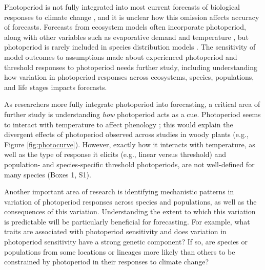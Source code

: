 \documentclass{article}
\begin{document}
\par Photoperiod is not fully integrated into most current forecasts of biological responses to climate change \citep[but see][]{tobin2008}, and it is unclear how this omission affects accuracy of forecasts. Forecasts from ecosystem models often incorporate photoperiod, along with other variables such as evaporative demand and temperature \citep [e.g., ED] []{jolly2005,medvigy2013}, but photoperiod is rarely included in species distribution models \citep [e.g.,] []{morin2009,zhu2012}. The sensitivity of model outcomes to assumptions made about experienced photoperiod and threshold responses to photoperiod needs further study, including understanding how variation in photoperiod responses across ecosystems, species, populations, and life stages impacts forecasts. 

\par As researchers more fully integrate photoperiod into forecasting, a critical area of further study is understanding \emph{how} photoperiod acts as a cue. Photoperiod seems to interact with temperature to affect phenology \citep[e.g., ][]{zydlewski2014}; this would explain the divergent effects of photoperiod observed across studies in woody plants (e.g., Figure \ref{fig:photocurve}). However, exactly how it interacts with temperature, as well as the type of response it elicits (e.g., linear versus threshold) and population- and species-specific threshold photoperiods, are not well-defined for many species (Boxes 1, S1).  

\par Another important area of research is identifying  mechanistic patterns in variation of photoperiod responses across species and populations, as well as the consequences of this variation. Understanding the extent to which this variation is predictable will be particularly beneficial for forecasting. For example, what traits are associated with photoperiod sensitivity and does variation in photoperiod sensitivity have a strong genetic component? If so, are species or populations from some locations or lineages more likely than others to be constrained by photoperiod in their responses to climate change?
\end{document}
